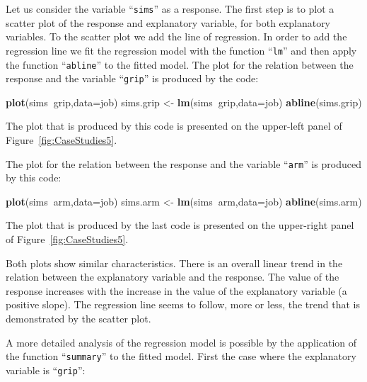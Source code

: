 \documentclass[]{krantz}
\makeatletter
\newenvironment{Shaded}{\begin{snugshade}}{\end{snugshade}}
\newcommand{\DataTypeTok}[1]{\textcolor[rgb]{0.13,0.29,0.53}{#1}}
\newcommand{\KeywordTok}[1]{\textcolor[rgb]{0.13,0.29,0.53}{\textbf{#1}}}
\newcommand{\NormalTok}[1]{#1}
\newcommand{\OperatorTok}[1]{\textcolor[rgb]{0.81,0.36,0.00}{\textbf{#1}}}
\newcommand{\StringTok}[1]{\textcolor[rgb]{0.31,0.60,0.02}{#1}}
\newenvironment{kframe}{%
\medskip{}
\setlength{\fboxsep}{.8em}
 \def\at@end@of@kframe{}%
 \ifinner\ifhmode%
  \def\at@end@of@kframe{\end{minipage}}%
  \begin{minipage}{\columnwidth}%
 \fi\fi%
 \def\FrameCommand##1{\hskip\@totalleftmargin \hskip-\fboxsep
 \colorbox{shadecolor}{##1}\hskip-\fboxsep
     \hskip-\linewidth \hskip-\@totalleftmargin \hskip\columnwidth}%
 \MakeFramed {\advance\hsize-\width
   \@totalleftmargin\z@ \linewidth\hsize
   \@setminipage}}%
 {\par\unskip\endMakeFramed%
 \at@end@of@kframe}
\renewenvironment{Shaded}{\begin{kframe}}{\end{kframe}}
\theoremstyle{definition}
\theoremstyle{definition}
\theoremstyle{definition}
\theoremstyle{remark}
\makeatother
\begin{document}
Let us consider the variable ``\texttt{sims}'' as a response. The first step is
to plot a scatter plot of the response and explanatory variable, for
both explanatory variables. To the scatter plot we add the line of
regression. In order to add the regression line we fit the regression
model with the function ``\texttt{lm}'' and then apply the function ``\texttt{abline}'' to
the fitted model. The plot for the relation between the response and the
variable ``\texttt{grip}'' is produced by the code:

\begin{Shaded}
\begin{Highlighting}[]
\KeywordTok{plot}\NormalTok{(sims}\OperatorTok{~}\NormalTok{grip,}\DataTypeTok{data=}\NormalTok{job)}
\NormalTok{sims.grip <-}\StringTok{ }\KeywordTok{lm}\NormalTok{(sims}\OperatorTok{~}\NormalTok{grip,}\DataTypeTok{data=}\NormalTok{job)}
\KeywordTok{abline}\NormalTok{(sims.grip)}
\end{Highlighting}
\end{Shaded}

The plot that is produced by this code is presented on the upper-left
panel of Figure~\ref{fig:CaseStudies5}.

The plot for the relation between the response and the variable ``\texttt{arm}''
is produced by this code:

\begin{Shaded}
\begin{Highlighting}[]
\KeywordTok{plot}\NormalTok{(sims}\OperatorTok{~}\NormalTok{arm,}\DataTypeTok{data=}\NormalTok{job)}
\NormalTok{sims.arm <-}\StringTok{ }\KeywordTok{lm}\NormalTok{(sims}\OperatorTok{~}\NormalTok{arm,}\DataTypeTok{data=}\NormalTok{job)}
\KeywordTok{abline}\NormalTok{(sims.arm)}
\end{Highlighting}
\end{Shaded}

The plot that is produced by the last code is presented on the
upper-right panel of Figure~\ref{fig:CaseStudies5}.

Both plots show similar characteristics. There is an overall linear
trend in the relation between the explanatory variable and the response.
The value of the response increases with the increase in the value of
the explanatory variable (a positive slope). The regression line seems
to follow, more or less, the trend that is demonstrated by the scatter
plot.

A more detailed analysis of the regression model is possible by the
application of the function ``\texttt{summary}'' to the fitted model. First the
case where the explanatory variable is ``\texttt{grip}'':
\end{document}
